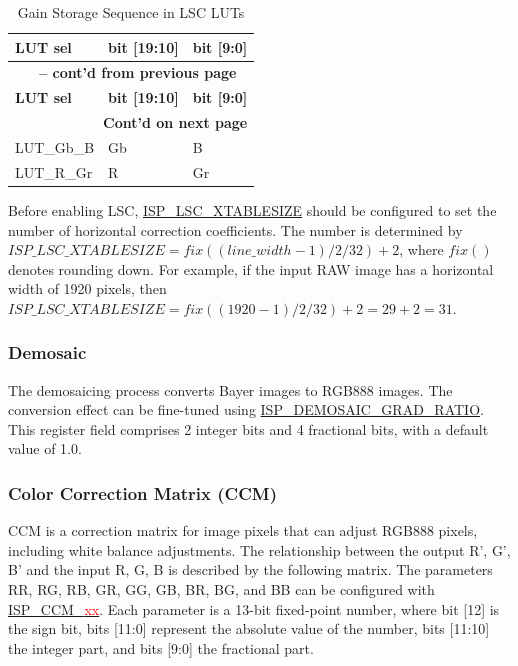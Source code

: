 \documentclass[main\_\_EN.tex]{subfiles}
\begin{document}
\begin{longtable}[c]{ |p{5cm}|p{3cm}|p{3cm}| }
    \caption{Gain Storage Sequence in LSC LUTs}
    \label{tab:lsc_lut_order}\\\hline

    \rowcolor{lightgray}
    \textbf{LUT sel} & \textbf{bit [19:10]} & \textbf{bit [9:0]} \\\hline
    \endfirsthead

    \multicolumn{3}{c}{\bfseries \tablename\ \thetable{} -- cont'd from previous page}\\\hline
    \rowcolor{lightgray}
    \textbf{LUT sel} & \textbf{bit [19:10]} & \textbf{bit [9:0]} \\\hline
    \endhead

    \multicolumn{3}{r}{\textbf{Cont'd on next page}} \\
    \endfoot

    \endlastfoot

        LUT\_Gb\_B & Gb & B \\\hline
        LUT\_R\_Gr & R & Gr \\\hline

\end{longtable}

Before enabling LSC, \hyperref[fielddesc:ISPLSCXTABLESIZE]{ISP\_LSC\_XTABLESIZE} should be configured to set the number of horizontal correction coefficients. The number is determined by
$ISP\_LSC\_XTABLESIZE = fix((line\_width -1)/2/32) + 2$, where $fix()$ denotes rounding down. For example, if the input RAW image has a horizontal width of 1920 pixels, then $ISP\_LSC\_XTABLESIZE = fix((1920-1)/2/32)+2 = 29+2 = 31$.


\subsubsection{Demosaic}
\label{sec:isp_demosaic}
The demosaicing process converts Bayer images to RGB888 images. The conversion effect can be fine-tuned using \hyperref[fielddesc:ISPDEMOSAICGRADRATIO]{ISP\_DEMOSAIC\_GRAD\_RATIO}. This register field comprises 2 integer bits and 4 fractional bits, with a default value of 1.0.


\subsubsection{Color Correction Matrix (CCM)}
\label{sec:isp_ccm}
CCM is a correction matrix for image pixels that can adjust RGB888 pixels, including white balance adjustments. The relationship between the output R', G', B' and the input R, G, B is described by the following matrix. The parameters RR, RG, RB, GR, GG, GB, BR, BG, and BB can be configured with \hyperref[fielddesc:ISPCCMRR]{ISP\_CCM\_\textcolor{red}{xx}}. Each parameter is a 13-bit fixed-point number, where bit [12] is the sign bit, bits [11:0] represent the absolute value of the number, bits [11:10] the integer part, and bits [9:0] the fractional part.
\end{document}
